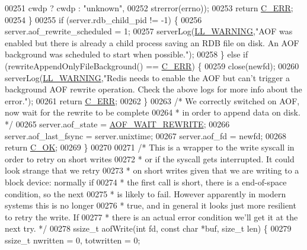 \begin{DoxyCode}
{{{00251             cwdp ? cwdp : \textcolor{stringliteral}{"unknown"},
00252             strerror(errno));
00253         \textcolor{keywordflow}{return} \hyperlink{server_8h_af98ac28d5f4d23d7ed5985188e6fb7d1}{C\_ERR};
00254     \}
00255     \textcolor{keywordflow}{if} (server.rdb\_child\_pid != -1) \{
00256         server.aof\_rewrite\_scheduled = 1;
00257         serverLog(\hyperlink{server_8h_a31229b9334bba7d6be2a72970967a14b}{LL\_WARNING},\textcolor{stringliteral}{"AOF was enabled but there is already a child process saving an
       RDB file on disk. An AOF background was scheduled to start when possible."});
00258     \} \textcolor{keywordflow}{else} \textcolor{keywordflow}{if} (rewriteAppendOnlyFileBackground() == \hyperlink{server_8h_af98ac28d5f4d23d7ed5985188e6fb7d1}{C\_ERR}) \{
00259         close(newfd);
00260         serverLog(\hyperlink{server_8h_a31229b9334bba7d6be2a72970967a14b}{LL\_WARNING},\textcolor{stringliteral}{"Redis needs to enable the AOF but can't trigger a background
       AOF rewrite operation. Check the above logs for more info about the error."});
00261         \textcolor{keywordflow}{return} \hyperlink{server_8h_af98ac28d5f4d23d7ed5985188e6fb7d1}{C\_ERR};
00262     \}
00263     \textcolor{comment}{/* We correctly switched on AOF, now wait for the rewrite to be complete}
00264 \textcolor{comment}{     * in order to append data on disk. */}
00265     server.aof\_state = \hyperlink{server_8h_a7d4b86c89be4d951fbf048130431a16a}{AOF\_WAIT\_REWRITE};
00266     server.aof\_last\_fsync = server.unixtime;
00267     server.aof\_fd = newfd;
00268     \textcolor{keywordflow}{return} \hyperlink{server_8h_a303769ef1065076e68731584e758d3e1}{C\_OK};
00269 \}
00270 
00271 \textcolor{comment}{/* This is a wrapper to the write syscall in order to retry on short writes}
00272 \textcolor{comment}{ * or if the syscall gets interrupted. It could look strange that we retry}
00273 \textcolor{comment}{ * on short writes given that we are writing to a block device: normally if}
00274 \textcolor{comment}{ * the first call is short, there is a end-of-space condition, so the next}
00275 \textcolor{comment}{ * is likely to fail. However apparently in modern systems this is no longer}
00276 \textcolor{comment}{ * true, and in general it looks just more resilient to retry the write. If}
00277 \textcolor{comment}{ * there is an actual error condition we'll get it at the next try. */}
00278 ssize\_t aofWrite(\textcolor{keywordtype}{int} fd, \textcolor{keyword}{const} \textcolor{keywordtype}{char} *buf, size\_t len) \{
00279     ssize\_t nwritten = 0, totwritten = 0;
}}}
\end{DoxyCode}
